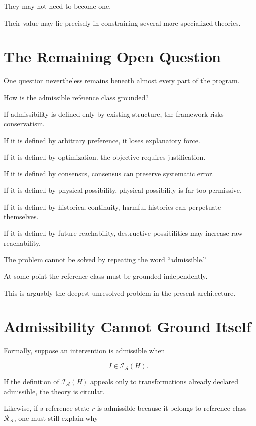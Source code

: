 \documentclass[11pt]{article}
\theoremstyle{remark}
\newcommand{\Adm}{\mathcal{A}}
\begin{document}
They may not need to become one.

Their value may lie precisely in constraining several more specialized theories.

\section{The Remaining Open Question}

One question nevertheless remains beneath almost every part of the program.

How is the admissible reference class grounded?

If admissibility is defined only by existing structure, the framework risks
conservatism.

If it is defined by arbitrary preference, it loses explanatory force.

If it is defined by optimization, the objective requires justification.

If it is defined by consensus, consensus can preserve systematic error.

If it is defined by physical possibility, physical possibility is far too
permissive.

If it is defined by historical continuity, harmful histories can perpetuate
themselves.

If it is defined by future reachability, destructive possibilities may increase
raw reachability.

The problem cannot be solved by repeating the word ``admissible.''

At some point the reference class must be grounded independently.

This is arguably the deepest unresolved problem in the present architecture.

\section{Admissibility Cannot Ground Itself}

Formally, suppose an intervention is admissible when

\begin{equation}
I\in\mathcal{I}_{\Adm}(H).
\end{equation}

If the definition of $\mathcal{I}_{\Adm}(H)$ appeals only to transformations
already declared admissible, the theory is circular.

Likewise, if a reference state $r$ is admissible because it belongs to
reference class $\mathcal{R}_{\Adm}$, one must still explain why
\end{document}
